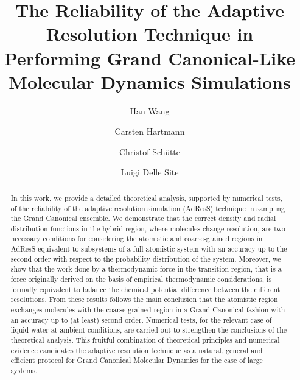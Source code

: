 \documentclass[aip,jcp,a4paper,reprint,onecolumn]{revtex4-1}
\begin{document}
\title{The Reliability of the Adaptive Resolution Technique in Performing  Grand Canonical-Like Molecular Dynamics Simulations}
\author{Han Wang}
\author{Carsten Hartmann}
\author{Christof Sch\"utte}
\author{Luigi Delle Site}

\begin{abstract}
  In this work, we provide a detailed theoretical analysis, supported by numerical tests, of the
  reliability of the adaptive resolution simulation (AdResS) technique in sampling the Grand Canonical
  ensemble. We demonstrate that the correct density and radial distribution
  functions in the hybrid region, where molecules change resolution, are two necessary conditions for
  considering the atomistic and coarse-grained regions in AdResS equivalent to subsystems
  of a full atomistic system with an accuracy up to the second order with respect to the probability distribution of the system. Moreover, we show that the
  work done by a thermodynamic force in the transition region, that is a force originally derived on the basis of empirical thermodynamic considerations, is formally equivalent to balance the chemical
  potential difference between the different resolutions. From these results follows the main conclusion that the atomistic region exchanges
  molecules with the coarse-grained region in a Grand Canonical
  fashion with an accuracy up to (at least) second order. Numerical tests, for the relevant case of liquid water at ambient conditions, are carried out to strengthen the conclusions of the theoretical analysis.
  This fruitful combination of theoretical principles and numerical evidence candidates the adaptive resolution technique as a natural, general and efficient protocol for Grand Canonical Molecular Dynamics for the case of large systems.
\end{abstract}

\maketitle
\end{document}
